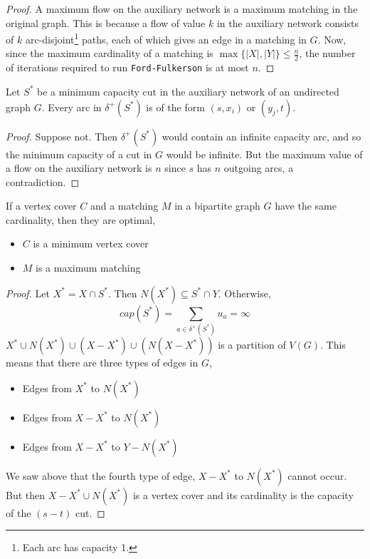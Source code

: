 	\begin{proof}
		A maximum flow on the auxiliary network is a maximum matching in the original graph. This is because a flow of value $k$ in the auxiliary network consists of $k$ arc-disjoint\footnote{Each arc has capacity 1.} paths, each of which gives an edge in a matching in $G$. Now, since the maximum cardinality of a matching is $\max \{|X|,|Y|\} \leq \frac{n}{2}$, the number of iterations required to run \texttt{Ford-Fulkerson} is at most $n$.
	\end{proof}

	\begin{lem}
		Let $S^*$ be a minimum capacity cut in the auxiliary network of an undirected graph $G$. Every arc in $\delta^+(S^*)$ is of the form $(s, x_i)$ or $(y_j, t)$.
	\end{lem}

	\begin{proof}
		Suppose not. Then $\delta^+(S^*)$ would contain an infinite capacity arc, and so the minimum capacity of a cut in $G$ would be infinite. But the maximum value of a flow on the auxiliary network is $n$ since $s$ has $n$ outgoing arcs, a contradiction.
	\end{proof}

	\begin{thm}
		If a vertex cover $C$ and a matching $M$ in a bipartite graph $G$ have the same cardinality, then they are optimal,
		\begin{itemize}
			\item $C$ is a minimum vertex cover
			\item $M$ is a maximum matching
		\end{itemize}
 	\end{thm}

 	\begin{proof}
 		Let $X^* = X \cap S^*$. Then $N(X^*) \subseteq S^* \cap Y$. Otherwise,
 		\[ cap(S^*) = \sum_{a \in \delta^+(S^*)} u_a = \infty \]
 		\noindent $X^* \cup N(X^*) \cup (X - X^*) \cup (N(X - X^*))$ is a partition of $V(G)$. This means that there are three types of edges in $G$,
 		\begin{itemize}
 			\item Edges from $X^*$ to $N(X^*)$
 			\item Edges from $X - X^*$ to $N(X^*)$
 			\item Edges from $X - X^*$ to $Y - N(X^*)$
 		\end{itemize}
 		\noindent We saw above that the fourth type of edge, $X - X^*$ to $N(X^*)$ cannot occur. But then $X - X^* \cup N(X^*)$ is a vertex cover and its cardinality is the capacity of the $(s-t)$ cut.
 	\end{proof}

